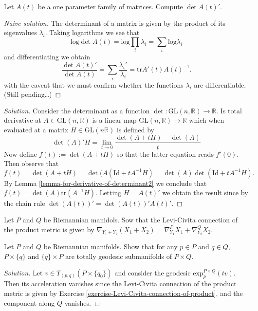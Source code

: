 \begin{exercise}
\label{exercise-derivative-of-determinant}
Let $A(t)$ be a one parameter family of matrices. Compute $\det A(t)'$.
\end{exercise}

\begin{proof}[Naive solution]
The determinant of a matrix is given by the product of its eigenvalues
$\lambda_i$. Taking logarithms we see that
$$
\text{log}\det A(t)=\text{log}\prod_{i}\lambda_i=\sum_{i}\text{log}\lambda_i
$$
and differentiating we obtain
$$
\frac{\det A(t)'}{\det A(t)}=\sum_i \frac{\lambda_i'}{\lambda_i}
=\text{tr} A'(t)A(t)^{-1}.
$$
with the caveat that we must confirm whether the functions $\lambda_i$ are
differentiable. (Still pending…)
\end{proof}

\begin{proof}[Solution]
Consider the determinant as a function 
$\det:\text{GL}(n,\mathbb{R})\to\mathbb{R}$. Is total derivative at 
$A \in \text{GL}(n,\mathbb{R})$ is a linear map 
$\text{GL}(n,\mathbb{R})\to \mathbb{R}$ which when evaluated at a matrix
$H\in\text{GL}(n\mathbb{R})$ is defined by
$$
\det(A)'H=\lim_{t\to0}\frac{\det(A+tH)-\det(A)}{t} 
$$
Now define $f(t):=\det(A+tH)$ so that the latter equation reads $f'(0)$. Then
observe that
$$
f(t)=\det(A+tH)=\det(A(\text{Id}+tA^{-1}H)=\det(A)\det(\text{Id}+tA^{-1}H).
$$
By Lemma \ref{lemma-for-derivative-of-determinant2} we conclude that 
$f(t)=\det(A)\text{tr}(A^{-1}H)$. Letting $H=A(t)'$ we obtain the result since
by the chain rule $\det(A(t))'=\det(A(t))'A(t)'$.
\end{proof}

\begin{exercise}
\label{exercise-Levi-Civita-connection-of-product}
Let $P$ and $Q$ be Riemannian manidols. Sow that the Levi-Civita connection of
the product metric is given by
$\nabla_{Y_1+Y_2}(X_1+X_2)=\nabla^P_{Y_1}X_1+\nabla^Q_{Y_2}X_2$.
\end{exercise}

\begin{exercise}
\label{exercise-totally-geodesic-submanifolds-of-product}
Let $P$ and $Q$ be Riemannian manifolds. Show that for any $p \in P$ and $q \in
Q$, $P\times \{q\}$ and $\{q\}\times P$ are totally geodesic
submanifolds of $P \times Q$.
\end{exercise}

\begin{proof}[Solution]
Let $v \in T_{(p,q)}(P\times\{q_0\})$ and consider the geodesic
 $\text{exp}_p^{P\times Q}(tv)$. Then
its acceleration vanishes since the Levi-Civita connection of the product metric
is given by Exercise \ref{exercise-Levi-Civita-connection-of-product}, and the
component along $Q$ vanishes.
\end{proof}

